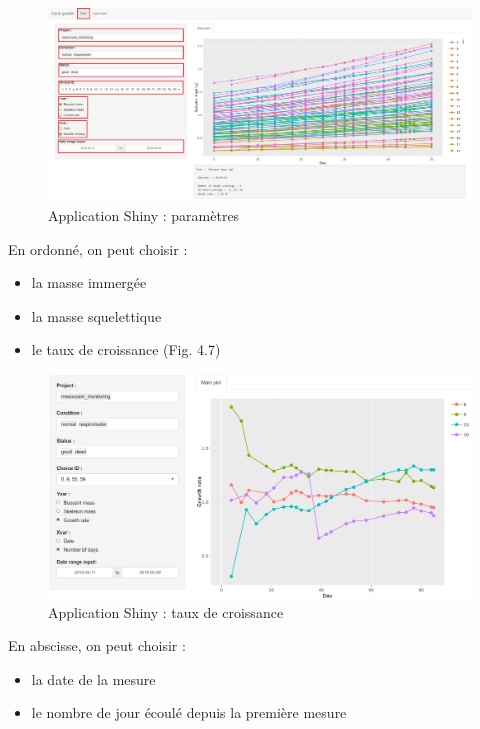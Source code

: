\documentclass[]{report}
\providecommand{\tightlist}{%
  \setlength{\itemsep}{0pt}\setlength{\parskip}{0pt}}
\begin{document}
\begin{figure}
\centering
\includegraphics[width=15.00000cm]{../image/notebook-plot2.PNG}
\caption{Application Shiny : paramètres}
\end{figure}

\vspace{0.5cm}

\null
\newpage

En ordonné, on peut choisir :

\begin{itemize}
\tightlist
\item
  la masse immergée
\item
  la masse squelettique
\item
  le taux de croissance (Fig. 4.7) 
\end{itemize}

\begin{figure}[h!]
\includegraphics[]{../image/taux-croissance.PNG}
\caption{Application Shiny : taux de croissance}
\end{figure}

En abscisse, on peut choisir :

\begin{itemize}
\tightlist
\item
  la date de la mesure
\item
  le nombre de jour écoulé depuis la première mesure
\end{itemize}
\end{document}

